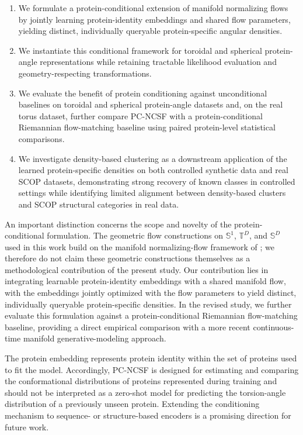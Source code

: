 \documentclass{article}
\begin{document}
{\color{red}
\begin{enumerate}
    \item We formulate a protein-conditional extension of manifold normalizing
    flows by jointly learning protein-identity embeddings and shared flow
    parameters, yielding distinct, individually queryable protein-specific
    angular densities.

    \item We instantiate this conditional framework for toroidal and spherical
    protein-angle representations while retaining tractable likelihood
    evaluation and geometry-respecting transformations.

    \item We evaluate the benefit of protein conditioning against unconditional
    baselines on toroidal and spherical protein-angle datasets and, on the real
    torus dataset, further compare PC-NCSF with a protein-conditional Riemannian
    flow-matching baseline using paired protein-level statistical comparisons.

    \item We investigate density-based clustering as a downstream application
    of the learned protein-specific densities on both controlled synthetic data
    and real SCOP datasets, demonstrating strong recovery of known classes in
    controlled settings while identifying limited alignment between
    density-based clusters and SCOP structural categories in real data.
\end{enumerate}
}

{\color{red}
An important distinction concerns the scope and novelty of the
protein-conditional formulation. The geometric flow constructions on
$\mathbb{S}^1$, $\mathbb{T}^D$, and $\mathbb{S}^D$ used in this work build
on the manifold normalizing-flow framework of \cite{Rezende2020}; we
therefore do not claim these geometric constructions themselves as a
methodological contribution of the present study. Our contribution lies in
integrating learnable protein-identity embeddings with a shared manifold
flow, with the embeddings jointly optimized with the flow parameters to
yield distinct, individually queryable protein-specific densities. In the
revised study, we further evaluate this formulation against a
protein-conditional Riemannian flow-matching baseline, providing a direct
empirical comparison with a more recent continuous-time manifold
generative-modeling approach.
}

{\color{red}
The protein embedding represents protein identity within the set of proteins
used to fit the model. Accordingly, PC-NCSF is designed for estimating and
comparing the conformational distributions of proteins represented during
training and should not be interpreted as a zero-shot model for predicting
the torsion-angle distribution of a previously unseen protein. Extending the
conditioning mechanism to sequence- or structure-based encoders is a
promising direction for future work.
}
\end{document}
